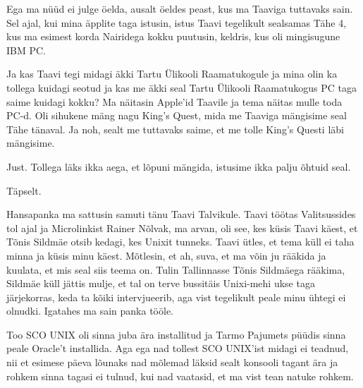
Ega ma nüüd ei julge öelda, ausalt öeldes peast, kus ma Taaviga tuttavaks sain. Sel ajal, kui mina äpplite taga istusin, istus Taavi tegelikult sealsamas Tähe 4, kus ma esimest korda Nairidega kokku puutusin, keldris, kus oli mingisugune IBM PC.

Ja kas Taavi tegi midagi äkki Tartu Ülikooli Raamatukogule ja mina olin ka tollega kuidagi seotud ja kas me äkki seal Tartu Ülikooli Raamatukogus PC taga saime kuidagi kokku? Ma näitasin Apple'id Taavile ja tema näitas mulle toda PC-d. Oli sihukene mäng nagu King's Quest, mida me Taaviga mängisime seal Tähe tänaval. Ja noh, sealt me tuttavaks saime, et me tolle King's Questi läbi mängisime.


Just. Tollega läks ikka aega, et lõpuni mängida,  istusime ikka palju õhtuid seal.


Täpselt. 


Hansapanka ma sattusin samuti tänu Taavi Talvikule. Taavi töötas Valitsussides tol ajal ja Microlinkist Rainer Nõlvak, ma arvan, oli see, kes küsis Taavi käest,  et Tõnis Sildmäe otsib kedagi, kes Unixit tunneks. Taavi ütles, et tema küll ei taha minna ja küsis minu käest. Mõtlesin, et ah, suva, et ma võin ju rääkida ja kuulata, et mis seal siis teema on. Tulin Tallinnasse Tõnis Sildmäega rääkima, Sildmäe küll jättis mulje, et tal on terve bussitäis Unixi-mehi ukse taga järjekorras, keda ta kõiki intervjueerib, aga vist tegelikult peale minu ühtegi ei olnudki. Igatahes ma sain panka tööle.

Too SCO UNIX oli sinna juba ära installitud ja Tarmo Pajumets püüdis  sinna peale Oracle't installida. Aga ega nad tollest SCO UNIX'ist midagi ei teadnud, nii et esimese päeva lõunaks nad mõlemad läksid sealt konsooli tagant ära ja rohkem sinna tagasi ei tulnud, kui nad vaatasid, et ma vist tean natuke rohkem.

